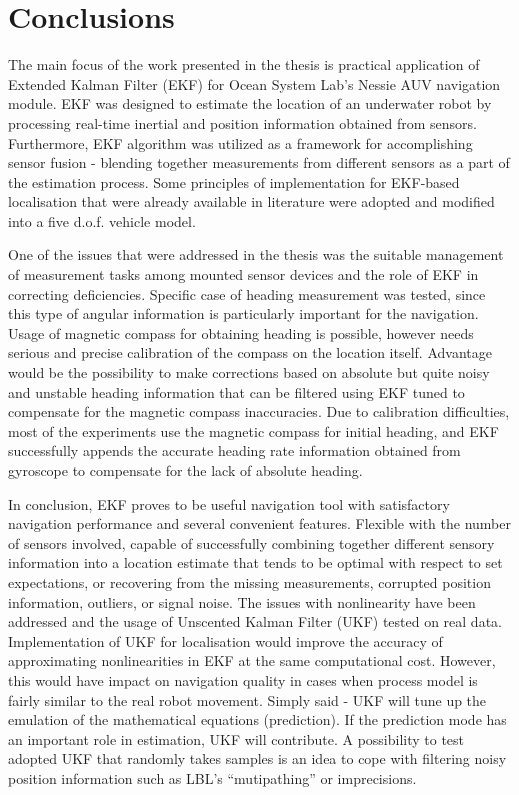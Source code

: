 \chapter{Conclusions} \label{chap:conclusions}
The main focus of the work presented in the thesis is practical application of Extended Kalman Filter (EKF) for Ocean System Lab's Nessie AUV navigation module. EKF was designed to estimate the location of an underwater robot by processing real-time inertial and position information obtained from sensors. Furthermore, EKF algorithm was utilized as a framework for accomplishing sensor fusion - blending together measurements from different sensors as a part of the estimation process. Some principles of implementation for EKF-based localisation that were already available in literature were adopted and modified into a five d.o.f. vehicle model.

One of the issues that were addressed in the thesis was the suitable management of measurement tasks among mounted sensor devices and the role of EKF in correcting deficiencies. Specific case of heading measurement was tested, since this type of angular information is particularly important for the navigation. Usage of magnetic compass for obtaining heading is possible, however needs serious and precise calibration of the compass on the location itself. Advantage would be the possibility to make corrections based on absolute but quite noisy and unstable heading information that can be filtered using EKF tuned to compensate for the magnetic compass inaccuracies. Due to calibration difficulties, most of the experiments use the magnetic compass for initial heading, and EKF successfully appends the accurate heading rate information obtained from gyroscope to compensate for the lack of absolute heading. 

In conclusion, EKF proves to be useful navigation tool with satisfactory navigation performance and several convenient features. Flexible with the number of sensors involved, capable of successfully combining together different sensory information into a location estimate that tends to be optimal with respect to set expectations, or recovering from the missing measurements, corrupted position information, outliers, or signal noise. The issues with nonlinearity have been addressed and the usage of Unscented Kalman Filter (UKF) tested on real data. Implementation of UKF for localisation would improve the accuracy of approximating nonlinearities in EKF at the same computational cost. However, this would have impact on navigation quality in cases when process model is fairly similar to the real robot movement. Simply said - UKF will tune up the emulation of the mathematical equations (prediction). If the prediction mode has an important role in estimation, UKF will contribute. A possibility to test adopted UKF that randomly takes samples is an idea to cope with filtering noisy position information such as LBL's ``mutipathing'' or imprecisions.      

